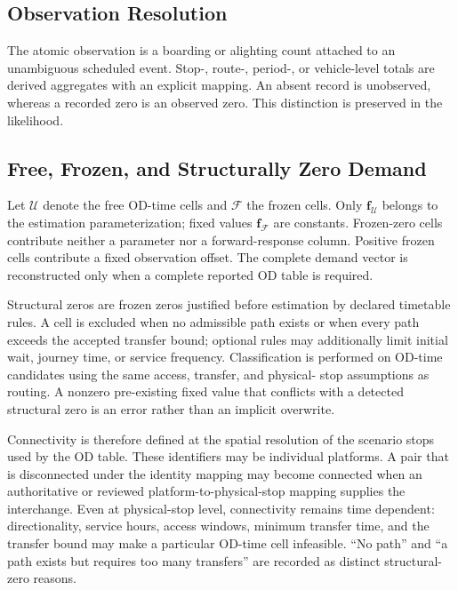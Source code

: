 \subsection{Observation Resolution}

The atomic observation is a boarding or alighting count attached to an
unambiguous scheduled event. Stop-, route-, period-, or vehicle-level totals
are derived aggregates with an explicit mapping. An absent record is
unobserved, whereas a recorded zero is an observed zero. This distinction is
preserved in the likelihood.

\subsection{Free, Frozen, and Structurally Zero Demand}

Let $\mathcal U$ denote the free OD-time cells and $\mathcal F$ the frozen
cells. Only $\bm f_{\mathcal U}$ belongs to the estimation parameterization;
fixed values $\bm f_{\mathcal F}$ are constants. Frozen-zero cells contribute
neither a parameter nor a forward-response column. Positive frozen cells
contribute a fixed observation offset. The complete demand vector is
reconstructed only when a complete reported OD table is required.

Structural zeros are frozen zeros justified before estimation by declared
timetable rules. A cell is excluded when no admissible path exists or when
every path exceeds the accepted transfer bound; optional rules may additionally
limit initial wait, journey time, or service frequency. Classification is
performed on OD-time candidates using the same access, transfer, and physical-
stop assumptions as routing. A nonzero pre-existing fixed value that conflicts
with a detected structural zero is an error rather than an implicit overwrite.

Connectivity is therefore defined at the spatial resolution of the scenario
stops used by the OD table. These identifiers may be individual platforms. A
pair that is disconnected under the identity mapping may become connected when
an authoritative or reviewed platform-to-physical-stop mapping supplies the
interchange. Even at physical-stop level, connectivity remains time dependent:
directionality, service hours, access windows, minimum transfer time, and the
transfer bound may make a particular OD-time cell infeasible. ``No path'' and
``a path exists but requires too many transfers'' are recorded as distinct
structural-zero reasons.
